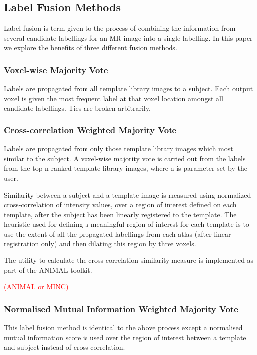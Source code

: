 \documentclass{article}\usepackage{graphicx, color}
\newcommand{\todo}[1]{
    \addcontentsline{tdo}{todo}{\protect{#1}}
    \textcolor{red}{#1}
}
\begin{document}
\subsection{Label Fusion Methods}

Label fusion is term given to the process of combining the information from several candidate labellings for an MR image into a single labelling.  In this paper we explore the benefits of three different fusion methods. 

\subsubsection{Voxel-wise Majority Vote}

Labels are propagated from all template library images to a subject.  Each output voxel is given the most frequent label at that voxel location amongst all candidate labellings.  Ties are broken arbitrarily.

\subsubsection{Cross-correlation Weighted Majority Vote}

Labels are propagated from only those template library images which most similar to the subject.  
A voxel-wise majority vote is carried out from the labels from the top n ranked template library 
images, where n is parameter set by the user. 

Similarity between a subject and a template image is measured using normalized cross-correlation of intensity values, over a region of interest defined on each template, after the subject has been linearly registered to the template. The heuristic used for defining a meaningful region of interest for each template is to use the extent of all the propagated labellings from each atlas (after linear registration only) and then dilating this region by three voxels.
 
The utility to calculate the cross-correlation similarity measure is implemented as part of the ANIMAL toolkit. \todo{(ANIMAL or MINC)}

\subsubsection{Normalised Mutual Information Weighted Majority Vote}

This label fusion method is identical to the above process except a normalised mutual information score is used over the region of interest between a template and subject instead of cross-correlation.  
\end{document}
